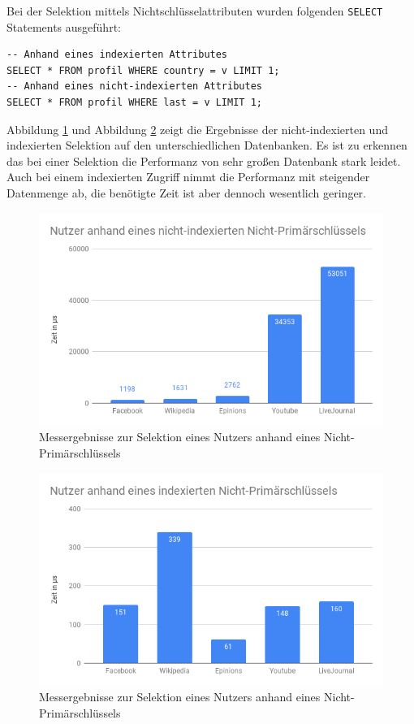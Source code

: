 Bei der Selektion mittels Nichtschlüsselattributen wurden folgenden \lstinline{SELECT} Statements ausgeführt:
\begin{lstlisting}
-- Anhand eines indexierten Attributes
SELECT * FROM profil WHERE country = v LIMIT 1;
-- Anhand eines nicht-indexierten Attributes
SELECT * FROM profil WHERE last = v LIMIT 1;
\end{lstlisting}

Abbildung \ref{fig:NutzerNPk} und Abbildung \ref{fig:NutzerNPkI} zeigt die Ergebnisse der nicht-indexierten und indexierten Selektion auf den unterschiedlichen Datenbanken. Es ist zu erkennen das bei einer Selektion die Performanz von sehr großen Datenbank stark leidet. Auch bei einem indexierten Zugriff nimmt die Performanz mit steigender Datenmenge ab, die benötigte Zeit ist aber dennoch wesentlich geringer.
\begin{figure}
	\centering
	\includegraphics[width=\textwidth]{images/NutzerNPk.png}
	\caption{Messergebnisse zur Selektion eines Nutzers anhand eines Nicht-Primärschlüssels}
	\label{fig:NutzerNPk}
\end{figure}

\begin{figure}
	\centering
	\includegraphics[width=\textwidth]{images/NutzerNPkI.png}
	\caption{Messergebnisse zur Selektion eines Nutzers anhand eines Nicht-Primärschlüssels}
	\label{fig:NutzerNPkI}
\end{figure}


